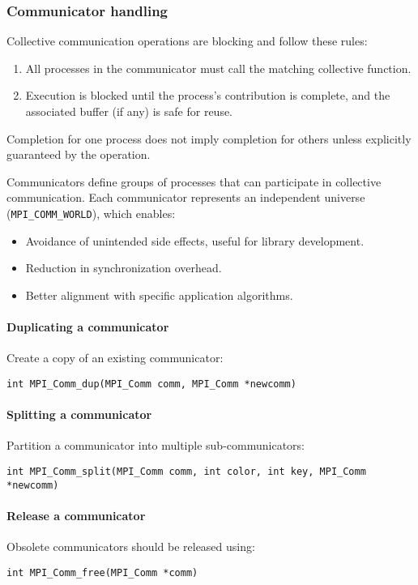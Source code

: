 \subsubsection{Communicator handling}
Collective communication operations are blocking and follow these rules:
\begin{enumerate}
    \item All processes in the communicator must call the matching collective function.
    \item Execution is blocked until the process's contribution is complete, and the associated buffer (if any) is safe for reuse.
\end{enumerate}
Completion for one process does not imply completion for others unless explicitly guaranteed by the operation.

Communicators define groups of processes that can participate in collective communication. 
Each communicator represents an independent universe (\texttt{MPI\_COMM\_WORLD}), which enables:
\begin{itemize}
    \item Avoidance of unintended side effects, useful for library development.
    \item Reduction in synchronization overhead.
    \item Better alignment with specific application algorithms.
\end{itemize}

\paragraph*{Duplicating a communicator}
Create a copy of an existing communicator:
\begin{lstlisting}[style=C]
int MPI_Comm_dup(MPI_Comm comm, MPI_Comm *newcomm)
\end{lstlisting}

\paragraph*{Splitting a communicator}
Partition a communicator into multiple sub-communicators:
\begin{lstlisting}[style=C]
int MPI_Comm_split(MPI_Comm comm, int color, int key, MPI_Comm *newcomm)
\end{lstlisting}

\paragraph*{Release a communicator}
Obsolete communicators should be released using:
\begin{lstlisting}[style=C]
int MPI_Comm_free(MPI_Comm *comm)
\end{lstlisting}

